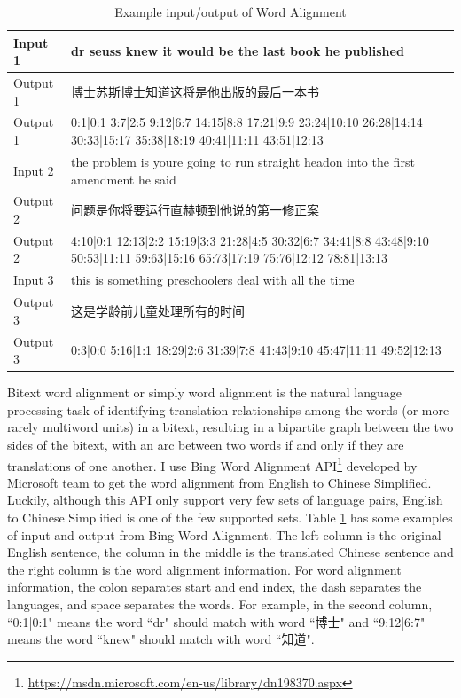 \begin{CJK}{UTF8}{gbsn}
\begin{table}[ht]
    \caption{Example input/output of Word Alignment}
    \label{table:bing_plus_plus_2}
    \begin{center}
    \begin{tabular}{| p{1.5cm} | p{5cm} |}
        \hline
        Input 1 & dr seuss knew it would be the last book he published\\
        \hline
        Output 1 & 博士苏斯博士知道这将是他出版的最后一本书\\
        \hline
        Output 1 & 0:1|0:1 3:7|2:5 9:12|6:7 14:15|8:8 17:21|9:9 23:24|10:10 26:28|14:14 30:33|15:17 35:38|18:19 40:41|11:11 43:51|12:13 \\
        \hline
        Input 2 & the problem is youre going to run straight headon into the first amendment he said \\
        \hline
        Output 2 & 问题是你将要运行直赫顿到他说的第一修正案\\
        \hline
        Output 2 & 4:10|0:1 12:13|2:2 15:19|3:3 21:28|4:5 30:32|6:7 34:41|8:8 43:48|9:10 50:53|11:11 59:63|15:16 65:73|17:19 75:76|12:12 78:81|13:13 \\
        \hline
        Input 3 & this is something preschoolers deal with all the time\\
        \hline
        Output 3 & 这是学龄前儿童处理所有的时间\\
        \hline
        Output 3 & 0:3|0:0 5:16|1:1 18:29|2:6 31:39|7:8 41:43|9:10 45:47|11:11 49:52|12:13\\
        \hline
    \end{tabular}
    \end{center}
\end{table}

Bitext word alignment or simply word alignment is the natural language processing task of identifying translation relationships among the words (or more rarely multiword units) in a bitext, resulting in a bipartite graph between the two sides of the bitext, with an arc between two words if and only if they are translations of one another. I use Bing Word Alignment API\footnote{\url{https://msdn.microsoft.com/en-us/library/dn198370.aspx}} developed by Microsoft team to get the word alignment from English to Chinese Simplified. Luckily, although this API only support very few sets of language pairs, English to Chinese Simplified is one of the few supported sets. Table \ref{table:bing_plus_plus_2} has some examples of input and output from Bing Word Alignment. The left column is the original English sentence, the column in the middle is the translated Chinese sentence and the right column is the word alignment information. For word alignment information, the colon separates start and end index, the dash separates the languages, and space separates the words. For example, in the second column, ``0:1|0:1" means the word ``dr" should match with word ``博士" and ``9:12|6:7" means the word ``knew" should match with word ``知道".


\end{CJK}
